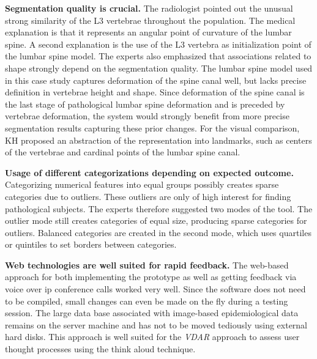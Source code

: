\documentclass[journal]{style/vgtc} 			          %
\newcommand{\rem}[1]{\textcolor{red}{\sout{#1}}}
\begin{document}
\textbf{Segmentation quality is crucial.}
The radiologist pointed out the unusual strong similarity of the L3 vertebrae throughout the population.
%
The medical explanation is that it represents an angular point of curvature of the lumbar spine.
%
A second explanation is the use of the L3 vertebra as initialization point of the lumbar spine model.
%
The experts also emphasized that associations related to shape strongly depend on the segmentation quality.
%
The lumbar spine model used in this case study captures deformation of the spine canal well, but lacks precise definition in vertebrae height and shape.
%
Since deformation of the spine canal is the last stage of pathological lumbar spine deformation and is preceded by vertebrae deformation, the system would strongly benefit from more precise segmentation results capturing these prior changes.
%
For the visual comparison, KH proposed an abstraction of the representation into landmarks, such as centers of the vertebrae and cardinal points of the lumbar spine canal.

\textbf{Usage of different categorizations depending on expected outcome.}
Categorizing numerical features into equal groups possibly creates sparse categories due to outliers.%
%
These outliers are only of high interest for finding pathological subjects. %
%
The experts therefore suggested two modes of the tool.
%
The outlier mode still creates categories of equal size, producing sparse categories for outliers.
%
Balanced categories are created in the second mode, which uses quartiles or quintiles to set borders between categories.
%

\textbf{Web technologies are well suited for rapid feedback.}
The web-based approach for both implementing the prototype as well as getting feedback via voice over ip conference calls worked very well.
%
Since the software does not need to be compiled, small changes can even be made on the fly during a testing session.
%
The large data base associated with image-based epidemiological data remains on the server machine and has not to be moved tediously using external hard disks.
%
This approach is well suited for the \emph{VDAR} approach to assess user thought processes using the think aloud technique.
\end{document}
